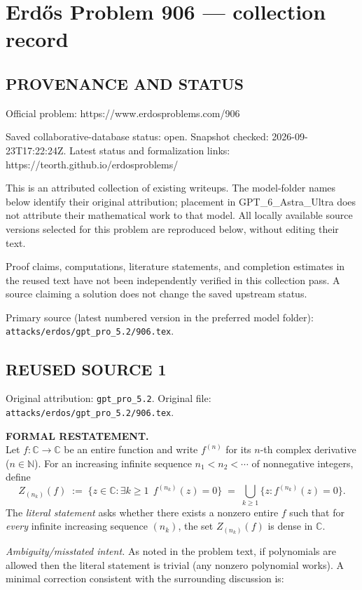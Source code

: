 \section*{Erd\H{o}s Problem 906 --- collection record}

\subsection*{PROVENANCE AND STATUS}
Official problem: https://www.erdosproblems.com/906

Saved collaborative-database status: open.
Snapshot checked: 2026-09-23T17:22:24Z.
Latest status and formalization links: https://teorth.github.io/erdosproblems/

This is an attributed collection of existing writeups. The model-folder names below identify their original attribution; placement in GPT\_6\_Astra\_Ultra does not attribute their mathematical work to that model. All locally available source versions selected for this problem are reproduced below, without editing their text.

Proof claims, computations, literature statements, and completion estimates in the reused text have not been independently verified in this collection pass. A source claiming a solution does not change the saved upstream status.

Primary source (latest numbered version in the preferred model folder): \texttt{attacks/erdos/gpt\_pro\_5.2/906.tex}.

\subsection*{REUSED SOURCE 1}
Original attribution: \texttt{gpt\_pro\_5.2}.
Original file: \texttt{attacks/erdos/gpt\_pro\_5.2/906.tex}.


\noindent\textbf{FORMAL RESTATEMENT.}\\
Let $f:\mathbb{C}\to\mathbb{C}$ be an entire function and write $f^{(n)}$ for its $n$-th complex derivative ($n\in\mathbb{N}$).  For an increasing infinite sequence $n_1<n_2<\cdots$ of nonnegative integers, define
\[
Z_{(n_k)}(f)\;:=\;\big\{z\in\mathbb{C}:\exists k\ge 1\ \ f^{(n_k)}(z)=0\big\}\;=\;\bigcup_{k\ge1} \{z: f^{(n_k)}(z)=0\}.
\]
The \emph{literal statement} asks whether there exists a nonzero entire $f$ such that for \emph{every} infinite increasing sequence $(n_k)$, the set $Z_{(n_k)}(f)$ is dense in $\mathbb{C}$.

\medskip
\noindent\emph{Ambiguity/misstated intent.}  As noted in the problem text, if polynomials are allowed then the literal statement is trivial (any nonzero polynomial works). A minimal correction consistent with the surrounding discussion is:

